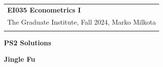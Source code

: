 \documentclass[a4paper,12pt]{article} %
\theoremstyle{nonitalic}
\begin{document}
\thispagestyle{empty} %

\begin{tabular}{p{15.5cm}} %
{\large \bf EI035 Econometrics I} \\
The Graduate Institute, Fall 2024, Marko Milkota\\
\hline %
\\
\end{tabular} %

\vspace*{0.3cm} %

\begin{center} %
	{\Large \bf PS2 Solutions} %
	\vspace{2mm}
	
	{\bf Jingle Fu} %
		
\end{center}  

\vspace{0.4cm}
\end{document}
